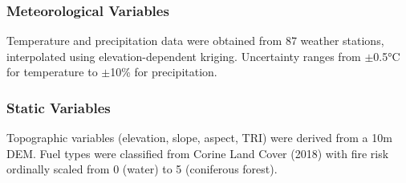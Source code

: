\documentclass[11pt,a4paper]{article}
\begin{document}
\subsubsection{Meteorological Variables}

Temperature and precipitation data were obtained from 87 weather stations, interpolated using elevation-dependent kriging. Uncertainty ranges from $\pm$0.5°C for temperature to $\pm$10\% for precipitation.

\subsubsection{Static Variables}

Topographic variables (elevation, slope, aspect, TRI) were derived from a 10m DEM. Fuel types were classified from Corine Land Cover (2018) with fire risk ordinally scaled from 0 (water) to 5 (coniferous forest).
\end{document}
